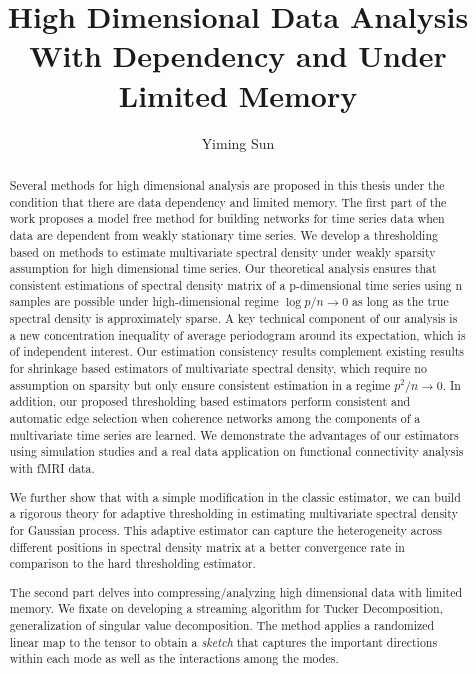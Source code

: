 \documentclass[phd,tocprelim]{cornell}
\title {High Dimensional Data Analysis With Dependency and Under Limited Memory}
\author {Yiming Sun}
\numberwithin{equation}{section}
\begin{document}
	\maketitle
	
	\makecopyright
	
	\begin{abstract}
		Several methods for high dimensional analysis are proposed  in this thesis under the condition that there are data dependency and limited memory. The first part of the work proposes a model free method for building networks for time series data when data are dependent from weakly stationary time series. We develop a thresholding based on methods to estimate multivariate spectral density under weakly sparsity assumption for high dimensional time series.
		Our theoretical analysis ensures that consistent estimations of spectral density matrix of a p-dimensional time series using n samples
		are possible under high-dimensional regime $\log p/n \rightarrow 0$ as long as the true spectral density is approximately sparse. A key technical component of our analysis is a new concentration inequality of
		average periodogram around its expectation, which is of independent interest. Our estimation consistency results complement existing results for shrinkage based estimators of multivariate spectral
		density, which require no assumption on sparsity but only ensure consistent estimation in a regime
		$p^2/n \rightarrow 0$. In addition, our proposed thresholding based estimators perform consistent and automatic
		edge selection when coherence networks among the components of a multivariate time series are learned.
		We demonstrate the advantages of our estimators using simulation studies and a real data application
		on functional connectivity analysis with fMRI data. \par 
		We further show that with a simple modification in the classic estimator, we can build a rigorous theory for adaptive thresholding in estimating multivariate spectral density for Gaussian process. This adaptive estimator can capture the heterogeneity across different positions in spectral density matrix at a better convergence rate in comparison to the hard thresholding estimator.   \par 
		The second part delves into compressing/analyzing high dimensional data with limited memory. We fixate on developing a streaming algorithm for Tucker Decomposition, generalization of singular value decomposition. The method applies a randomized linear map to the tensor to obtain a \emph{sketch}
		that captures the important directions within each mode as well as the interactions among the modes.

\end{abstract}
\end{document}
